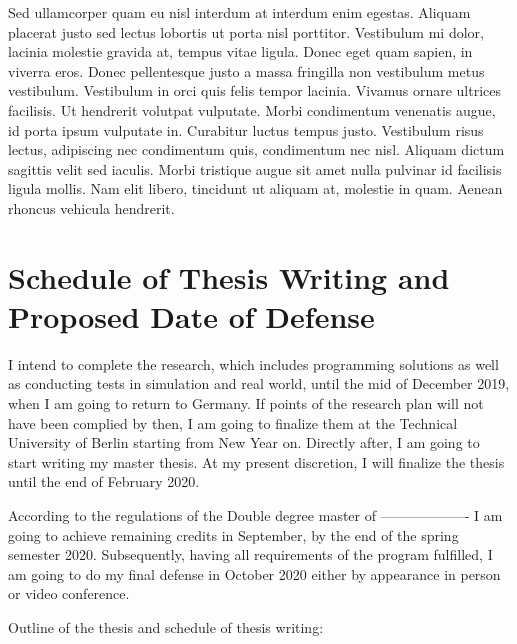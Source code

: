 Sed ullamcorper quam eu nisl interdum at interdum enim egestas. Aliquam placerat justo sed lectus lobortis ut porta nisl porttitor. Vestibulum mi dolor, lacinia molestie gravida at, tempus vitae ligula. Donec eget quam sapien, in viverra eros. Donec pellentesque justo a massa fringilla non vestibulum metus vestibulum. Vestibulum in orci quis felis tempor lacinia. Vivamus ornare ultrices facilisis. Ut hendrerit volutpat vulputate. Morbi condimentum venenatis augue, id porta ipsum vulputate in. Curabitur luctus tempus justo. Vestibulum risus lectus, adipiscing nec condimentum quis, condimentum nec nisl. Aliquam dictum sagittis velit sed iaculis. Morbi tristique augue sit amet nulla pulvinar id facilisis ligula mollis. Nam elit libero, tincidunt ut aliquam at, molestie in quam. Aenean rhoncus vehicula hendrerit.



\section{Schedule of Thesis Writing and Proposed Date of Defense}

I intend to complete the research,
which includes programming solutions
as well as conducting tests in simulation and real world,
until the mid of December 2019,
when I am going to return to Germany.
If points of the research plan will not have been complied by then,
I am going to finalize them at 
the Technical University of Berlin
starting from New Year on.
Directly after, I am going to start writing my master thesis.
At my present discretion,
I will finalize the thesis until
the end of February 2020.

According to the regulations of the
Double degree master of -------------------
I am going to achieve remaining credits in September,
by the end of the spring semester 2020.
Subsequently, having all requirements of the program fulfilled,
I am going to do my final defense in October 2020
either by appearance in person or video conference.


Outline of the thesis and schedule of thesis writing:

